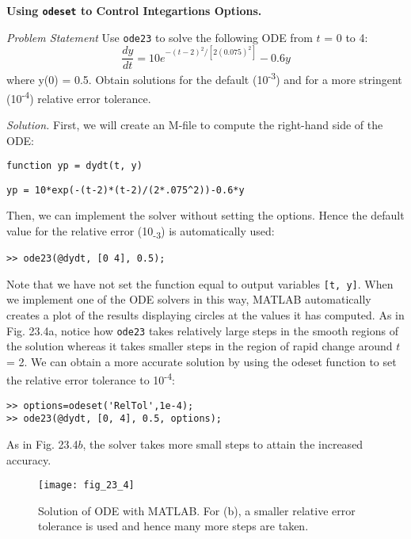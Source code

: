 \documentclass[../main.tex]{subfiles}
\begin{document}
\begin{example}\textbf{Using \texttt{odeset} to Control Integartions Options.}

    \noindent\textit{Problem Statement} \quad Use \texttt{ode23} to solve the following ODE from $t$ = 0 to 4:
        \begin{equation}
        \frac{d y}{d t}=10 e^{-(t-2)^{2} /\left[2(0.075)^{2}\right]}-0.6 y  \nonumber
    \end{equation} 
\noindent where y(0) = 0.5. Obtain solutions for the default (10\textsuperscript{-3}) and for a more stringent (10\textsuperscript{-4}) relative error tolerance.

\noindent\textit{Solution.} First, we will create an M-file to compute the right-hand side of the ODE:\

\texttt{function yp = dydt(t, y)}

\texttt{yp = 10*exp(-(t-2)*(t-2)/(2*.075\^{}2))-0.6*y}

\noindent Then, we can implement the solver without setting the options. Hence the default value for
the relative error (10\textsubscript{-3}) is automatically used:

\texttt{>> ode23(@dydt, [0 4], 0.5);}

\noindent Note that we have not set the function equal to output variables \texttt{[t, y]}. When we implement one of the ODE solvers in this way, MATLAB automatically creates a plot of the
results displaying circles at the values it has computed. As in Fig. 23.4a, notice how \texttt{ode23}
takes relatively large steps in the smooth regions of the solution whereas it takes smaller
steps in the region of rapid change around $t$ = 2.
We can obtain a more accurate solution by using the odeset function to set the relative error tolerance to 10\textsuperscript{-4}:
\begin{lstlisting}
>> options=odeset('RelTol',1e-4);
>> ode23(@dydt, [0, 4], 0.5, options);
\end{lstlisting}


\noindent As in Fig. 23.4$b$, the solver takes more small steps to attain the increased accuracy.

\begin{figure}[H]
    \centering
    \texttt{[image: fig\_23\_4]}
   \caption{\textsf{Solution of ODE with MATLAB. For (b), a smaller relative error tolerance is used and hence many
   more steps are taken.}}\label{fig:fig_23_4}
\end{figure}
\end{example}
\end{document}
